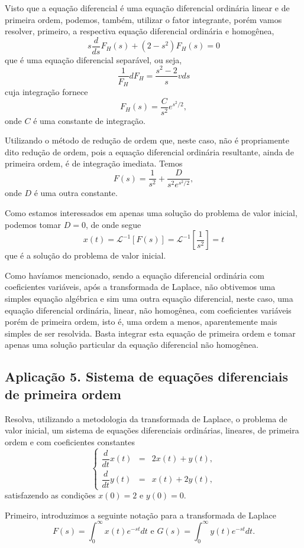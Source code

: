 Visto que a equação diferencial é uma equação diferencial ordinária linear e de primeira ordem, podemos, também, utilizar o fator integrante, porém vamos resolver, primeiro, a respectiva equação diferencial ordinária e homogênea,
$$s \dfrac{d}{ds} F_H(s) + (2 - s^{2})F_H(s) = 0$$
que é uma equação diferencial separável, ou seja,
$$\dfrac{1}{F_H} dF_H =
\dfrac{s^{2} - 2}{s}vds$$
cuja integração fornece
$$F_H(s) =
\dfrac{C}{s^{2}} e^{s^{2}/2},$$
onde $C$ é uma constante de integração.

Utilizando o método de redução de ordem que, neste caso, não é propriamente dito redução de ordem, pois a equação diferencial ordinária resultante, ainda de primeira ordem, é de integração imediata. Temos
$$F(s) =
\dfrac{1}{s^{2}} +
\dfrac{D}{s^{2} e^{s^{2}/2}},$$
onde $D$ é uma outra constante.

Como estamos interessados em apenas uma solução do problema de valor inicial, podemos tomar $D = 0$, de onde segue
$$x(t) = \mathscr{L}^{-1}[F(s)] = \mathscr{L}^{-1}
\left[
\dfrac{1}{s^{2}}
\right]
= t$$
que é a solução do problema de valor inicial.

Como havíamos mencionado, sendo a equação diferencial ordinária com coeficientes variáveis, após a transformada de Laplace, não obtivemos uma simples equação algébrica e sim uma outra equação diferencial, neste caso, uma equação diferencial ordinária, linear, não homogênea, com coeficientes variáveis porém de primeira ordem, isto é, uma ordem a menos, aparentemente mais simples de ser resolvida. Basta integrar esta equação de primeira ordem e tomar apenas uma solução particular da equação diferencial não homogênea.

\subsection{Aplicação 5. Sistema de equações diferenciais de primeira ordem}

Resolva, utilizando a metodologia da transformada de Laplace, o problema de valor inicial, um sistema de equações diferenciais ordinárias, lineares, de primeira ordem e com coeficientes constantes
$$\left\{\begin{array}{rcl}
\dfrac{d}{dt} x(t) &=& 2x(t) + y(t), \\[0.5cm]
\dfrac{d}{dt} y(t) &=& x(t) + 2y(t),
\end{array}\right.$$
satisfazendo as condições $x(0) = 2$ e $y(0) = 0$.

Primeiro, introduzimos a seguinte notação para a transformada de Laplace
$$F(s) =
\int_{0}^{\infty}
x(t) e^{-st}dt
\mbox{ e }
G(s) =
\int_{0}^{\infty}
y(t) e^{-st}dt.
$$

